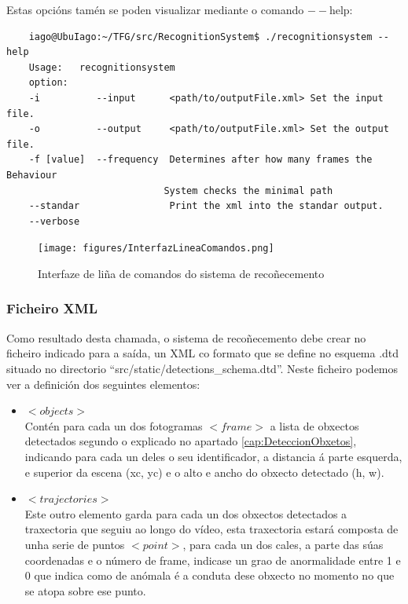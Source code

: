         Estas opcións tamén se poden visualizar mediante o comando $--$help:\\ 
        \begin{verbatim}
    iago@UbuIago:~/TFG/src/RecognitionSystem$ ./recognitionsystem --help
    Usage:   recognitionsystem
    option:  
    -i          --input      <path/to/outputFile.xml> Set the input file.
    -o          --output     <path/to/outputFile.xml> Set the output file.
    -f [value]  --frequency  Determines after how many frames the Behaviour 
                            System checks the minimal path
    --standar                Print the xml into the standar output.
    --verbose
        \end{verbatim}
        
        \begin{figure}[htp]
        \begin{center}
            \texttt{[image: figures/InterfazLineaComandos.png]}
            \caption{Interfaze de liña de comandos do sistema de recoñecemento}
        \label{fig:InterfazLineaComandos}
        \end{center}
        \end{figure}
        
        \subsubsection{Ficheiro XML}
            Como resultado desta chamada, o sistema de recoñecemento debe crear no ficheiro indicado 
            para a saída, un XML co formato que se define no esquema .dtd situado no directorio
            ``src/static/detections\_schema.dtd''. Neste ficheiro podemos ver a definición dos 
            seguintes elementos:
            
            \begin{itemize}
            \item{{\textbf{$<objects>$\\}}}
                Contén para cada un dos fotogramas $<frame>$ a lista de obxectos detectados segundo
                o explicado no apartado \ref{cap:DeteccionObxetos}, indicando para cada un deles o 
                seu identificador, a distancia á parte esquerda, e superior da escena (xc, yc) e o 
                alto e ancho do obxecto detectado (h, w).
            \item{{\textbf{$<trajectories>$\\}}}
                Este outro elemento garda para cada un dos obxectos detectados a traxectoria que 
                seguiu ao longo do vídeo, esta traxectoria estará composta de unha serie de puntos
                $<point>$, para cada un dos cales, a parte das súas coordenadas e o número de 
                frame, indicase un grao de anormalidade entre 1 e 0 que indica como de anómala é 
                a conduta dese obxecto no momento no que se atopa sobre ese punto.
            \end{itemize}
            
